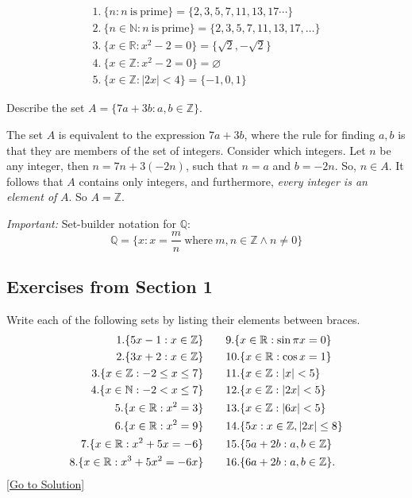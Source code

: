 \begin{example}
    
$$
\begin{aligned}
1.~ \{ n:n~\mathrm{is~prime} \} = \{ 2,3,5,7,11,13,17\cdots \}\\
2.~ \{ n\in\mathbb{N}: n\mathrm{~is~prime} \} = \{ 2,3,5,7,11,13,17,\dots \}\\
3.~ \{ x\in\mathbb{R}: x^2-2=0 \} = \{ \sqrt2,-\sqrt2 \}\\
4.~ \{ x\in\mathbb{Z}:x^2-2=0 \} = \varnothing\\
5.~ \{ x\in\mathbb{Z}: |2x|<4 \} = \{ -1,0,1 \}
\end{aligned}
$$
\end{example}

\begin{example}
Describe the set $A=\{ 7a+3b: a,b\in\mathbb{Z} \}$. 
\begin{solution}
The set $A$ is equivalent to the expression $7a+3b$, where the rule for finding $a,b$ is that they are members of the set of integers. Consider which integers. Let $n$ be any integer, then $n=7n+3(-2n)$, such that $n=a$ and $b=-2n$. So, $n\in A$. It follows that $A$ contains only integers, and furthermore, \emph{every integer is an element of} $A$. So $A=\mathbb{Z}$.    
\end{solution}  
\end{example}


\emph{Important:} Set-builder notation for $\mathbb{Q}$: 
$$
\mathbb{Q} = \{ x: x = \frac {m}{n} \mathrm{~where~}m,n\in\mathbb{Z}\land n\neq 0 \}
$$

\subsection{Exercises from Section 1}
\begin{exercise}\label{ex:1.1}
    Write each of the following sets by listing their elements between braces. 
    $$
    \begin{aligned}
    1. \{ 5x-1:x\in\mathbb{Z} \} &\quad\quad 9. \{ x\in\mathbb{R}:\sin\pi x=0 \}\\
    2. \{ 3x+2:x\in\mathbb{Z} \} &\quad\quad 10. \{ x\in\mathbb{R}:\cos x=1 \}\\
    3. \{ x\in\mathbb{Z}:-2\le x\le 7 \} &\quad\quad 11. \{ x\in \mathbb{Z}:\lvert x \rvert < 5 \}\\
    4. \{ x\in \mathbb{N}: -2 < x \le 7\} &\quad\quad 12. \{ x\in\mathbb{Z}: \lvert 2x \rvert<5 \}\\
    5. \{ x\in\mathbb{R}:x^2=3 \} &\quad\quad 13. \{ x\in\mathbb{Z}:\lvert 6x \rvert < 5 \}\\
    6. \{ x\in\mathbb{R}:x^2=9 \} &\quad\quad 14. \{ 5x:x\in\mathbb{Z},\lvert 2x \rvert\le 8 \}\\
    7. \{ x\in\mathbb{R}:x^2+5x=-6 \} &\quad\quad 15. \{ 5a+2b:a,b\in\mathbb{Z} \}\\
    8. \{ x\in\mathbb{R}:x^3+5x^2=-6x \} &\quad\quad 16. \{ 6a+2b:a,b\in\mathbb{Z} \}.
    \end{aligned}
    $$
    \hyperref[sol:1.1]{[Go to Solution]}
\end{exercise}

